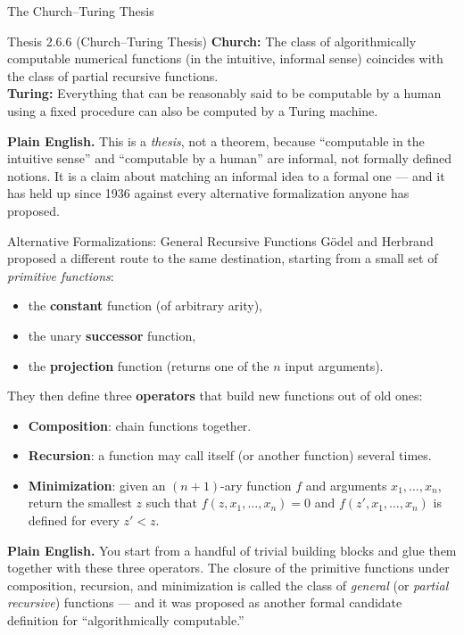 \documentclass[aspectratio=169,10pt]{beamer}
\begin{document}
\begin{frame}{The Church--Turing Thesis}
  \begin{block}{Thesis 2.6.6 (Church--Turing Thesis)}
    \textbf{Church:} The class of algorithmically computable numerical
    functions (in the intuitive, informal sense) coincides with the class of
    partial recursive functions. \\[1mm]
    \textbf{Turing:} Everything that can be reasonably said to be computable by
    a human using a fixed procedure can also be computed by a Turing machine.
  \end{block}
  \textbf{Plain English.} This is a \emph{thesis}, not a theorem, because
  ``computable in the intuitive sense'' and ``computable by a human'' are
  informal, not formally defined notions. It is a claim about matching an
  informal idea to a formal one --- and it has held up since 1936 against
  every alternative formalization anyone has proposed.
\end{frame}

\begin{frame}{Alternative Formalizations: General Recursive Functions}
  Gödel and Herbrand proposed a different route to the same destination,
  starting from a small set of \emph{primitive functions}:
  \begin{itemize}
    \item the \textbf{constant} function (of arbitrary arity),
    \item the unary \textbf{successor} function,
    \item the \textbf{projection} function (returns one of the $n$ input
      arguments).
  \end{itemize}
  They then define three \textbf{operators} that build new functions out of
  old ones:
  \begin{itemize}
    \item \textbf{Composition}: chain functions together.
    \item \textbf{Recursion}: a function may call itself (or another function)
      several times.
    \item \textbf{Minimization}: given an $(n+1)$-ary function $f$ and
      arguments $x_1,\dots,x_n$, return the smallest $z$ such that
      $f(z, x_1,\dots,x_n) = 0$ and $f(z', x_1,\dots,x_n)$ is defined for
      every $z' < z$.
  \end{itemize}
  \textbf{Plain English.} You start from a handful of trivial building blocks
  and glue them together with these three operators. The closure of the
  primitive functions under composition, recursion, and minimization is called
  the class of \emph{general} (or \emph{partial recursive}) functions --- and
  it was proposed as another formal candidate definition for ``algorithmically
  computable.''
\end{frame}
\end{document}
